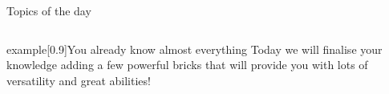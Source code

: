 
\begin{frame}
    \titlepage
\end{frame}
\begin{frame}{Topics of the day}
    \medskip
    \begin{columns}[t]
        \begin{column}{.45\textwidth}
            \hspace*{4mm}
            \begin{minipage}[t][0.45\textheight]{\textwidth}
                \tableofcontents[sections={1-4}]
            \end{minipage}
        \end{column}
        \begin{column}{.45\textwidth}
            \begin{minipage}[t][0.45\textheight]{\textwidth}
                \tableofcontents[sections={5-}]
            \end{minipage}
        \end{column}
    \end{columns}
    \vspace{6mm}
    \begin{varblock}{example}[0.9\textwidth]{You already know almost everything}
        Today we will finalise your knowledge adding a few powerful bricks that will provide you with lots of versatility and great abilities!
    \end{varblock}
\end{frame}
